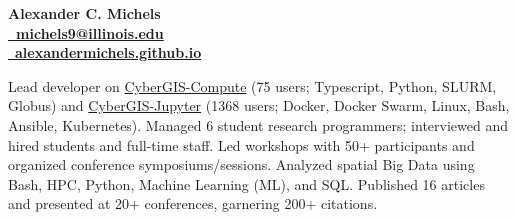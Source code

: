 \documentclass{acmresume}
\begin{document}
	
	\begin{multicols}{2}
		\textbf{\huge Alexander C. Michels}\\ \columnbreak
        \hfill\href{mailto:michels9@illinois.edu}{\textbf{\faEnvelope~michels9@illinois.edu}} \\
        \hfill\href{http://alexandermichels.github.io}{\faGlobeAmericas~\textbf{alexandermichels.github.io}} \\
	\end{multicols}
    \vspace*{-.25cm}



	
	
		
		
	
	
        \begin{titemize}
            \titem Lead developer on \href{https://github.com/cybergis/cybergis-compute-python-sdk}{CyberGIS-Compute} (75 users; Typescript, Python, SLURM, Globus) and \href{https://cybergisx.cigi.illinois.edu/}{CyberGIS-Jupyter} (1368 users; Docker, Docker Swarm, Linux, Bash, Ansible, Kubernetes).
            \titem Managed 6 student research programmers; interviewed and hired students and full-time staff.
            \titem Led workshops with 50+ participants and organized conference symposiums/sessions.
            \titem Analyzed spatial Big Data using Bash, HPC, Python, Machine Learning (ML), and SQL.
            \titem Published 16 articles and presented at 20+ conferences, garnering 200+ citations.
        \end{titemize}
\end{document}
